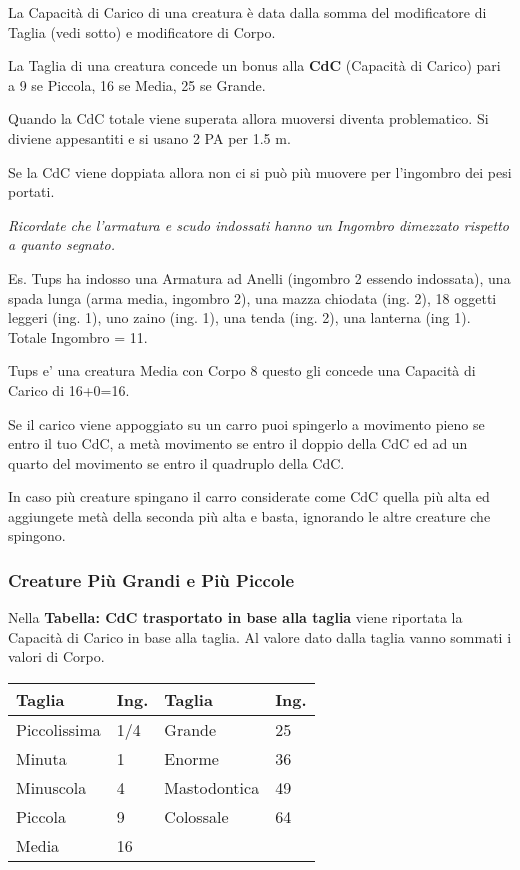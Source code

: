 \documentclass[12pt,a4paper,twoside,openany]{book}
\begin{document}
\begin{multicols}{2}
La Capacità di Carico di una creatura è data dalla somma del modificatore di Taglia (vedi sotto) e modificatore di Corpo.

La Taglia di una creatura concede un bonus alla \textbf{CdC} (Capacità di Carico) pari a 9 se Piccola, 16 se Media, 25 se Grande.

Quando la CdC totale viene superata allora muoversi diventa problematico.  Si diviene appesantiti e si usano 2 PA per 1.5 m. 

Se la CdC viene doppiata allora non ci si può più muovere per l'ingombro dei pesi portati.

\textit{Ricordate che l'armatura e scudo indossati hanno un Ingombro dimezzato rispetto a quanto segnato.}

Es. Tups ha indosso una Armatura ad Anelli (ingombro 2 essendo indossata), una spada lunga (arma media, ingombro 2), una mazza chiodata (ing. 2), 18 oggetti leggeri (ing. 1), uno zaino (ing. 1), una tenda (ing. 2), una lanterna (ing 1). Totale Ingombro = 11.

Tups e' una creatura Media con Corpo 8 questo gli concede una Capacità di Carico di 16+0=16.

Se il carico viene appoggiato su un carro puoi spingerlo a movimento pieno se entro il tuo CdC, a metà movimento se entro il doppio della CdC ed ad un quarto del movimento se entro il quadruplo della CdC.

In caso più creature spingano il carro considerate come CdC quella più alta ed aggiungete metà della seconda più alta e basta, ignorando le altre creature che spingono.

\subsubsection{Creature Più Grandi e Più Piccole}

Nella \textbf{Tabella: CdC trasportato in base alla taglia} viene riportata la Capacità di Carico in base alla taglia. Al valore dato dalla taglia vanno sommati i valori di Corpo.

\medskip

\begin{tabularx}{0.45\textwidth}{ll|ll}
\textbf{Taglia}& \textbf{Ing.}&\textbf{Taglia} & \textbf{Ing.}\\
\toprule
Piccolissima &1/4& Grande & 25\\
Minuta & 1 & Enorme& 36\\
Minuscola & 4& Mastodontica&49\\
Piccola & 9 & Colossale&64\\
Media & 16&&\\
\end{tabularx}


\end{multicols}
\end{document}
